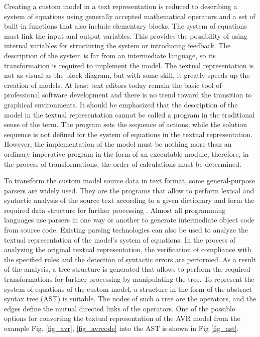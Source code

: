 \documentclass[lettersize,journal]{IEEEtran}
\begin{document}
Creating a custom model in a text representation is reduced to describing a system of equations using generally accepted
mathematical operators and a set of built-in functions that also include elementary blocks. The system of equations must 
link the input and output variables. This provides the possibility of using internal variables for structuring the 
system or introducing feedback. The description of the system is far from an intermediate language, so its transformation 
is required to implement the model. The textual representation is not as visual as the block diagram, 
but with some skill, it greatly speeds up the creation of models. At least text editors today remain the basic tool 
of professional software development and there is no trend toward the transition to graphical environments. 
It should be emphasized that the description of the model in the textual representation cannot be called a program in the
traditional sense of the term. The program sets the sequence of actions, while the solution sequence is not defined for the 
system of equations in the textual representation. However, the implementation of the model must be nothing more than an ordinary
imperative program in the form of an executable module, therefore, in the process of transformations, 
the order of calculations must be determined.

To transform the custom model source data in text format, some general-purpose parsers are widely used. They are the programs
that allow to perform lexical and syntactic analysis of the source text according to a given dictionary and form the required 
data structure for further processing \cite{texbook}. Almost all programming languages use parsers in one way or another to generate 
intermediate object code from source code. Existing parsing technologies can also be used to analyze the textual representation 
of the model's system of equations. In the process of analyzing the original textual representation, the verification of compliance 
with the specified rules and the detection of syntactic errors are performed. As a result of the analysis, a tree structure is
generated that allows to perform the required transformations for further processing by manipulating the tree. To represent the system of equations 
of the custom model, a structure in the form of the abstract syntax tree (AST) is suitable. The nodes of such a tree are the
operators, and the edges define the mutual directed links of the operators. One of the possible options for converting the textual
representation of the AVR model from the example Fig. \ref{fig_avr}, \ref{fig_avrcode} into the AST is shown in Fig \ref{fig_ast}.
\end{document}
